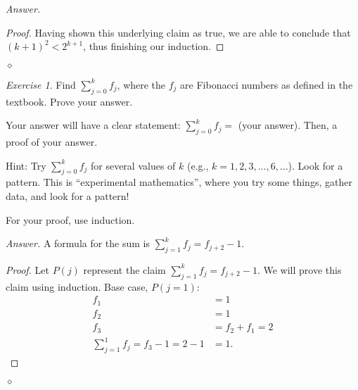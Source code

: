 \documentclass[12pt,oneside]{amsart}
\theoremstyle{remark}
\newtheorem{exer}{Exercise}
\newenvironment{answer}{\bigskip\noindent\emph{Answer.}}{\hfill$\diamond$\newline}
\begin{document}
\begin{answer}
\begin{proof}
Having shown this underlying claim as true, we are able to conclude that $(k + 1)^2 < 2^{k + 1}$, thus finishing our induction. %
\end{proof}

\end{answer}

%
%
%
%

\newpage
\begin{exer}
Find $\sum_{j = 0}^k f_j$, where the $f_j$ are Fibonacci numbers as defined in the textbook. Prove your answer.

Your answer will have a clear statement: $\sum_{j = 0}^k f_j =$ (your answer). Then, a proof of your answer.

Hint: Try $\sum_{j = 0}^k f_j$ for several values of $k$ (e.g., $k = 1, 2, 3, ..., 6, ...$). Look for a pattern. This is “experimental mathematics”, where you try some things, gather data, and look for a pattern!

For your proof, use induction.
\end{exer}

\begin{answer}
A formula for the sum is $\sum_{j = 1}^k f_j = f_{j + 2} - 1$.

\begin{proof}
Let $P(j)$ represent the claim $\sum_{j = 1}^k f_j = f_{j + 2} - 1$. We will prove this claim using induction. Base case, $P(j = 1)$:
\begin{align*}
f_1 &= 1 \\
f_2 &= 1 \\
f_3 &= f_2 + f_1 = 2 \\
\sum_{j = 1}^{1} f_j = f_3 - 1 = 2 - 1 &= 1.
\end{align*}

\end{proof}
\end{answer}
\end{document}
